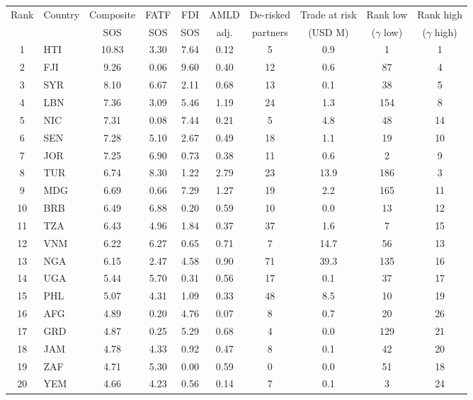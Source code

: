 \begin{tabular}{clcccccccc}
\toprule
Rank & Country & Composite & FATF & FDI & AMLD & De-risked & Trade at risk & Rank low & Rank high \\
 & & SOS & SOS & SOS & adj. & partners & (USD M) & ($\gamma$ low) & ($\gamma$ high) \\
\midrule
1 & HTI & 10.83 & 3.30 & 7.64 & 0.12 & 5 & 0.9 & 1 & 1 \\
2 & FJI & 9.26 & 0.06 & 9.60 & 0.40 & 12 & 0.6 & 87 & 4 \\
3 & SYR & 8.10 & 6.67 & 2.11 & 0.68 & 13 & 0.1 & 38 & 5 \\
4 & LBN & 7.36 & 3.09 & 5.46 & 1.19 & 24 & 1.3 & 154 & 8 \\
5 & NIC & 7.31 & 0.08 & 7.44 & 0.21 & 5 & 4.8 & 48 & 14 \\
6 & SEN & 7.28 & 5.10 & 2.67 & 0.49 & 18 & 1.1 & 19 & 10 \\
7 & JOR & 7.25 & 6.90 & 0.73 & 0.38 & 11 & 0.6 & 2 & 9 \\
8 & TUR & 6.74 & 8.30 & 1.22 & 2.79 & 23 & 13.9 & 186 & 3 \\
9 & MDG & 6.69 & 0.66 & 7.29 & 1.27 & 19 & 2.2 & 165 & 11 \\
10 & BRB & 6.49 & 6.88 & 0.20 & 0.59 & 10 & 0.0 & 13 & 12 \\
11 & TZA & 6.43 & 4.96 & 1.84 & 0.37 & 37 & 1.6 & 7 & 15 \\
12 & VNM & 6.22 & 6.27 & 0.65 & 0.71 & 7 & 14.7 & 56 & 13 \\
13 & NGA & 6.15 & 2.47 & 4.58 & 0.90 & 71 & 39.3 & 135 & 16 \\
14 & UGA & 5.44 & 5.70 & 0.31 & 0.56 & 17 & 0.1 & 37 & 17 \\
15 & PHL & 5.07 & 4.31 & 1.09 & 0.33 & 48 & 8.5 & 10 & 19 \\
16 & AFG & 4.89 & 0.20 & 4.76 & 0.07 & 8 & 0.7 & 20 & 26 \\
17 & GRD & 4.87 & 0.25 & 5.29 & 0.68 & 4 & 0.0 & 129 & 21 \\
18 & JAM & 4.78 & 4.33 & 0.92 & 0.47 & 8 & 0.1 & 42 & 20 \\
19 & ZAF & 4.71 & 5.30 & 0.00 & 0.59 & 0 & 0.0 & 51 & 18 \\
20 & YEM & 4.66 & 4.23 & 0.56 & 0.14 & 7 & 0.1 & 3 & 24 \\
\bottomrule
\end{tabular}